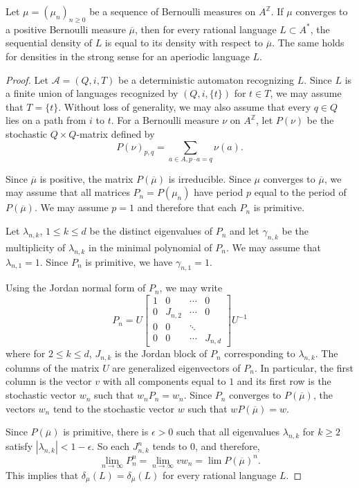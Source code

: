 \documentclass[10pt,a4paper]{amsart}
\newcommand\A{\mathcal{A}}
\newcommand{\Z}{\mathbb{Z}}
\begin{document}
\begin{theorem}\label{theoremDensityPositiveBernoulli}
Let $\mu=(\mu_n)_{n\ge 0}$ be a sequence of Bernoulli measures on $A^\Z$. If $\mu$ converges
to a positive Bernoulli measure $\overline{\mu}$, then for every rational language $L\subset A^*$, the sequential
density of $L$ is equal to its density with respect to $\overline{\mu}$.
The same holds for densities in the strong sense for an aperiodic language $L$.
\end{theorem}

\begin{proof}
Let $\A=(Q,i,T)$ be a deterministic automaton recognizing $L$. 
Since $L$ is a finite union of languages
recognized by $(Q,i,\{t\})$ for $t\in T$, we may assume that $T=\{t\}$. 
Without loss of generality,
we may also assume that every $q\in Q$ lies on a path from $i$ to $t$. For a Bernoulli measure $\nu$ on $A^\Z$,
let $P(\nu)$ be the stochastic $Q\times Q$-matrix
defined by 
\begin{equation}\label{eqMarkovChain}
P(\nu)_{p,q}=\sum_{a\in A,p\cdot a=q}\nu(a).\end{equation}

Since $\overline{\mu}$ is positive, the matrix $P(\overline{\mu})$ is irreducible.
Since $\mu$ converges to $\overline{\mu}$, we may assume that all matrices $P_n=P(\mu_n)$ have
period $p$ equal to the period of $P(\overline{\mu})$. We may assume $p=1$ and therefore
that each $P_n$ is primitive. 

Let $\lambda_{n,k}$, $1\le k\le d$ be the distinct eigenvalues of $P_n$ and let $\gamma_{n,k}$ be the multiplicity
of $\lambda_{n,k}$ in the minimal polynomial of $P_n$. We may assume that $\lambda_{n,1}=1$. Since $P_n$
is primitive, we have $\gamma_{n,1}=1$.

Using the Jordan normal form of $P_n$, we may write
\[P_n=U\begin{bmatrix}1&0&\cdots&0\\0&J_{n,2}&\cdots&0\\0&0&\ddots\\0&0&\cdots&J_{n,d}\end{bmatrix}U^{-1}\]
where for $2\le k\le d$, $J_{n,k}$ is the Jordan block of $P_n$ corresponding to $\lambda_{n,k}$.
The columns of the matrix $U$ are generalized eigenvectors of $P_n$.
In particular, the first column is the vector $v$ with all components equal to $1$
and its first row is the stochastic vector $w_n$ such that $w_nP_n=w_n$.
Since $P_n$ converges to $P(\overline{\mu})$, the vectors $w_n$ tend to the
stochastic vector $w$ such that $wP(\overline{\mu})=w$.

 Since $P(\overline{\mu})$
is primitive, there is $\epsilon>0$ such that all eigenvalues $\lambda_{n,k}$ for $k\ge 2$ satisfy $|\lambda_{n,k}|<1-\epsilon$. 
So each $J_{n,k}^n$ tends to $0$, and therefore,
\[\lim_{n\to\infty}P_n^{n}=\lim_{n\to\infty}vw_n=\lim P(\overline{\mu})^n.\]
 This implies that $\delta_\mu(L)=\delta_{\overline{\mu}}(L)$
for every rational language $L$.
\end{proof}
\end{document}
